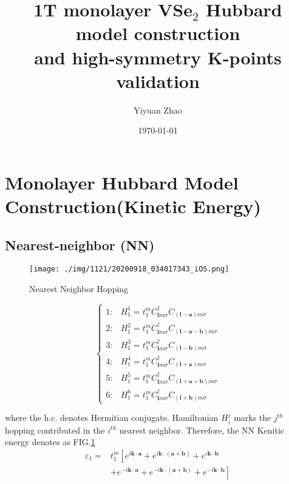 \documentclass[reprint, aps, prb, showkeys]{revtex4-2}
\begin{document}
\title{1T monolayer VSe$_2$ Hubbard model construction\\
        and high-symmetry K-points validation}

\author{Yiyuan Zhao}
\date{\today}

\maketitle

\section{Monolayer Hubbard Model Construction(Kinetic Energy)}
\subsection{Nearest-neighbor (NN)}
\begin{figure}[b]
    \texttt{[image: ./img/1121/20200918\_034017343\_iOS.png]}
    \caption{\label{fig:NN}Nearest Neighbor Hopping}
\end{figure}

\begin{equation}
    \begin{cases}
        1: & H_1^1 = t_1^m C_{\boldsymbol{l}m\sigma}^{\dagger}C_{(\boldsymbol{l}-\boldsymbol{a})m\sigma}\\
        2: & H_1^2 = t_1^m C_{\boldsymbol{l}m\sigma}^{\dagger}C_{(\boldsymbol{l}-\boldsymbol{a}-\boldsymbol{b})m\sigma}\\
        3: & H_1^3 = t_1^m C_{\boldsymbol{l}m\sigma}^{\dagger}C_{(\boldsymbol{l}-\boldsymbol{b})m\sigma}\\
        4: & H_1^4 = t_1^m C_{\boldsymbol{l}m\sigma}^{\dagger}C_{(\boldsymbol{l}+\boldsymbol{a})m\sigma}\\
        5: & H_1^5 = t_1^m C_{\boldsymbol{l}m\sigma}^{\dagger}C_{(\boldsymbol{l}+\boldsymbol{a}+\boldsymbol{b})m\sigma}\\
        6: & H_1^6 = t_1^m C_{\boldsymbol{l}m\sigma}^{\dagger}C_{(\boldsymbol{l}+\boldsymbol{b})m\sigma}
    \end{cases} \label{NN}
\end{equation}

where the h.c. denotes Hermitian conjugate. Hamiltonian $H_i^j$ marks the $j^{th}$ hopping contributed in the $i^{th}$ nearest neighbor. Therefore, the NN Kenitic energy denotes as FIG.\ref{fig:NN}
\begin{equation}
\begin{aligned}
    \varepsilon_1=&t_1^m \left[ e^{i \boldsymbol{k} \cdot \boldsymbol{a}}+e^{i \boldsymbol{k} \cdot (\boldsymbol{a} + \boldsymbol{b}) }+e^{i \boldsymbol{k} \cdot \boldsymbol{b}} \right.\\
    & \left. +e^{-i\boldsymbol{k} \cdot \boldsymbol{a}}+e^{-i \boldsymbol{k} \cdot (\boldsymbol{a} + \boldsymbol{b}) }+e^{-i \boldsymbol{k} \cdot \boldsymbol{b}} \right]
\end{aligned}
\label{NNhopping}
\end{equation}
\end{document}

